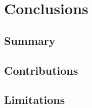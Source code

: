 %

\chapter{\label{ch:6-conclusion}Conclusions} 

\section{Summary}

\section{Contributions}

\section{Limitations}


